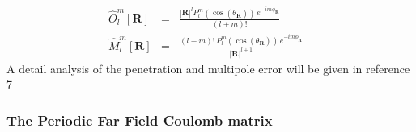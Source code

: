 \commentoutA{\documentclass[prb,aps,twocolumn,showpacs,twocolumngrid,superbib]{revtex4}}
\begin{document}
\begin{eqnarray}
\widehat{O}_{l}^{m}\left[ {\mathbf{R}}\right]  & = & \frac{\left| {\mathbf{R}}\right| ^{l}P_{l}^{m}
\left( \cos \left( \theta _{\mathbf{R}}\right) \right) \, e^{-im\phi _{\mathbf{R}}}}{\left( l+m\right) !}
\begin{array}{c}
\\

\end{array}\label{sp_mult_O} \\
\widehat{M}_{l}^{m}\left[ {\mathbf{R}}\right]  & = & \frac{\left( l-m\right) !\, P_{l}^{m}\left( \cos \left( 
\theta _{\mathbf{R}}\right) \right) \, e^{-im\phi _{\mathbf{R}}}}{\left| {\mathbf{R}}\right| ^{l+1}}
\begin{array}{c}
\\

\end{array}\label{sp_mult_M} 
\end{eqnarray}
A detail analysis of the penetration and  multipole error will be given in
reference 7 


\subsubsection{The Periodic Far Field Coulomb matrix}
\end{document}

